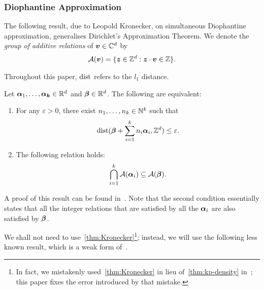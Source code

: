 \subsubsection{Diophantine Approximation}

The following result, due to Leopold Kronecker, on simultaneous Diophantine approximation, generalises Dirichlet's Approximation Theorem. We denote the \emph{group of additive relations} of $\boldsymbol{v} \in \mathbb{C}^{d}$ by
\begin{align*}
{\mathcal{A}}(\boldsymbol{v}) = \lbrace \boldsymbol{z} \in \mathbb{Z}^{d} : \boldsymbol{z} \cdot \boldsymbol{v} \in \mathbb{Z} \rbrace .
\end{align*}

Throughout this paper, $\operatorname{dist}$ refers to the $l_{1}$ distance.

\begin{theorem}[Kronecker]
\label{thm:Kronecker}
Let $\boldsymbol{\alpha}_{1}, \ldots, \boldsymbol{\alpha_{k}} \in \mathbb{R}^{d}$ and $\boldsymbol{\beta} \in \mathbb{R}^{d}$. The following are equivalent:
\begin{enumerate}
  \item For any $\varepsilon > 0$, there exist $n_{1}, \ldots, n_{k} \in \mathbb{N}^{k}$ such that
\begin{align*}
\operatorname{dist}(\boldsymbol{\beta} + \sum\limits_{i=1}^{k} n_{i} \boldsymbol{\alpha}_{i}, \mathbb{Z}^{d}) \leq \varepsilon .
\end{align*}
\item The following relation holds:
\begin{align*}
\bigcap\limits_{i=1}^{k} {\mathcal{A}}(\boldsymbol{\alpha}_{i}) \subseteq {\mathcal{A}}(\boldsymbol{\beta}) .
\end{align*}
\end{enumerate}
\end{theorem}

A proof of this result can be found in~\cite{Cassels}.
Note that the second condition essentially states that all the integer relations that are satisfied by all the $\boldsymbol{\alpha}_{i}$ are also satisfied by $\boldsymbol{\beta}$.

We shall not need to use~\cref{thm:Kronecker}\footnote{In fact, we mistakenly used~\cref{thm:Kronecker} in lieu of~\cref{thm:kp-density} in~\cite{LICS16}; this paper fixes the error introduced by that mistake.}; instead, we will use the following less known result, which is a weak form of~\cite[Corollary 2.8]{KhachiyanP97}.

